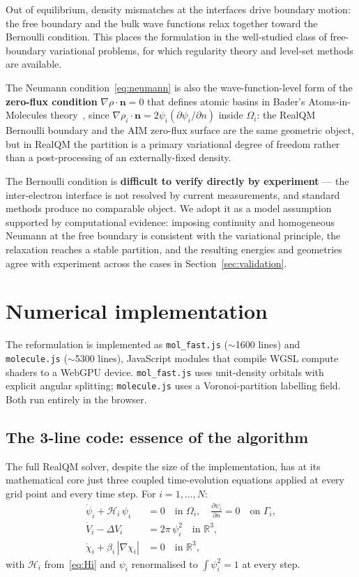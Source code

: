 \documentclass[11pt]{article}
\begin{document}
Out of equilibrium, density mismatches at the interfaces drive boundary motion: the free boundary and the bulk wave functions relax together toward the Bernoulli condition. This places the formulation in the well-studied class of free-boundary variational problems, for which regularity theory and level-set methods are available.

The Neumann condition~\eqref{eq:neumann} is also the wave-function-level form of the \textbf{zero-flux condition} $\nabla\rho\cdot\mathbf{n}=0$ that defines atomic basins in Bader's Atoms-in-Molecules theory~\cite{Bader90}, since $\nabla\rho_i\cdot\mathbf{n} = 2\psi_i(\partial\psi_i/\partial n)$ inside $\Omega_i$: the RealQM Bernoulli boundary and the AIM zero-flux surface are the same geometric object, but in RealQM the partition is a primary variational degree of freedom rather than a post-processing of an externally-fixed density.

The Bernoulli condition is \textbf{difficult to verify directly by experiment} --- the inter-electron interface is not resolved by current measurements, and standard methods produce no comparable object. We adopt it as a model assumption supported by computational evidence: imposing continuity and homogeneous Neumann at the free boundary is consistent with the variational principle, the relaxation reaches a stable partition, and the resulting energies and geometries agree with experiment across the cases in Section~\ref{sec:validation}.

\section{Numerical implementation}\label{sec:implementation}

The reformulation is implemented as \texttt{mol\_fast.js} ($\sim$1600 lines) and \texttt{molecule.js} ($\sim$5300 lines), JavaScript modules that compile WGSL compute shaders to a WebGPU device. \texttt{mol\_fast.js} uses unit-density orbitals with explicit angular splitting; \texttt{molecule.js} uses a Voronoi-partition labelling field. Both run entirely in the browser.

\subsection{The 3-line code: essence of the algorithm}\label{sec:3line}

The full RealQM solver, despite the size of the implementation, has at its mathematical core just three coupled time-evolution equations applied at every grid point and every time step. For $i = 1, \ldots, N$:
\begin{align}
\dot{\psi}_i + \mathcal{H}_i\, \psi_i &= 0 \quad\text{in } \Omega_i, \quad \frac{\partial \psi_i}{\partial n} = 0 \quad\text{on } \Gamma_i, \label{eq:3line-psi} \\
\dot{V}_i - \Delta V_i &= 2\pi\, \psi_i^2 \quad\text{in } \mathbb{R}^3, \label{eq:3line-V} \\
\dot{\chi}_i + \beta_i\, |\nabla \chi_i| &= 0 \quad\text{in } \mathbb{R}^3, \label{eq:3line-chi}
\end{align}
with $\mathcal{H}_i$ from~\eqref{eq:Hi} and $\psi_i$ renormalised to $\int \psi_i^2 = 1$ at every step.
\end{document}
